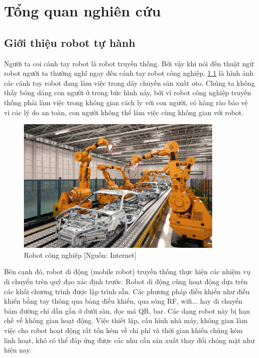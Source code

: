 \chapter{Tổng quan nghiên cứu}
\label{chap:1tqnc}

\section{Giới thiệu robot tự hành}


%

Người ta coi cánh tay robot là robot truyền thống.
Bởi vậy khi nói đến thuật ngữ robot người ta thường nghĩ ngay đến cánh tay robot công nghiệp. \figurename{\ref{fig:RBCongNghiep}} là hình ảnh các cánh tay robot đang làm việc trong dây chuyền sản xuất oto. Chúng ta không thấy bóng dáng con người ở trong bức hình này, bởi vì robot công nghiệp truyền thống phải làm việc trong không gian cách ly với con người, có hàng rào bảo vệ vì các lý do an toàn, con người không thể làm việc cùng không gian với robot.

\begin{figure}[hpt]
  \centering
  \includegraphics[width=10cm]{figures/IndustrialRobot.jpg}
  \caption{Robot công nghiệp [Nguồn: Internet]}
  \label{fig:RBCongNghiep}
\end{figure}

Bên cạnh đó, robot di động (mobile robot) truyền thống thực hiện các nhiệm vụ di chuyển trên quỹ đạo xác định trước. Robot di động cũng hoạt động dựa trên các khối chương trình được lập trình sẵn. Các phương pháp điều khiển như điều khiển bằng tay thông qua bảng điều khiển, qua sóng RF, wifi... hay di chuyển bám đường chỉ dẫn gắn ở dưới sàn, đọc mã QR, bar. Các dạng robot này bị hạn chế về không gian hoạt động. Việc thiết lập, cấu hình nhà máy, không gian làm việc cho robot hoạt động rất tốn kém về chi phí và thời gian khiến chúng kém linh hoạt, khó có thể đáp ứng được các nhu cầu sản xuất thay đổi chóng mặt như hiện nay.


